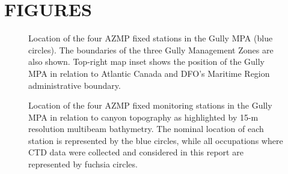\documentclass[12pt]{article}\usepackage[]{graphicx}\usepackage[]{color}
\begin{document}
\hypertarget{sec:figures}{%
\section{FIGURES}\label{sec:figures}}



\vspace*{\fill}
\begin{figure}[htb]

{\centering {} 

}

\caption{Location of the four AZMP fixed stations in the Gully MPA (blue circles). The boundaries of the three Gully Management Zones are also shown. Top-right map inset shows the position of the Gully MPA in relation to Atlantic Canada and DFO's Maritime Region administrative boundary.}\label{fig:figure1}
\end{figure}
\vspace*{\fill}

\clearpage


\begin{figure}[htb]

{\centering {} 

}

\caption{Location of the four AZMP fixed monitoring stations in the Gully MPA in relation to canyon topography as highlighted by 15-m resolution multibeam bathymetry. The nominal location of each station is represented by the blue circles, while all occupations where CTD data were collected and considered in this report are represented by fuchsia circles.}\label{fig:figure2}
\end{figure}
\clearpage
\end{document}
